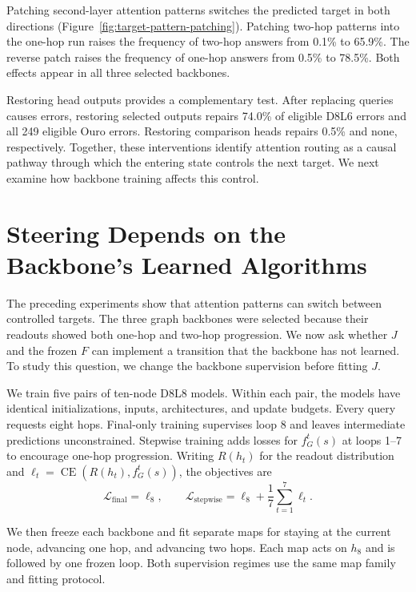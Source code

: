 \documentclass{article}
\begin{document}
Patching second-layer attention patterns switches the predicted target in both directions (Figure~\ref{fig:target-pattern-patching}). Patching two-hop patterns into the one-hop run raises the frequency of two-hop answers from 0.1\% to 65.9\%. The reverse patch raises the frequency of one-hop answers from 0.5\% to 78.5\%. Both effects appear in all three selected backbones.

Restoring head outputs provides a complementary test. After replacing queries causes errors, restoring selected outputs repairs 74.0\% of eligible D8L6 errors and all 249 eligible Ouro errors. Restoring comparison heads repairs 0.5\% and none, respectively. Together, these interventions identify attention routing as a causal pathway through which the entering state controls the next target. We next examine how backbone training affects this control.

\section{Steering Depends on the Backbone's Learned Algorithms}
\label{sec:generalization}\label{sec:supervision-boundary}
The preceding experiments show that attention patterns can switch between controlled targets. The three graph backbones were selected because their readouts showed both one-hop and two-hop progression. We now ask whether $J$ and the frozen $F$ can implement a transition that the backbone has not learned. To study this question, we change the backbone supervision before fitting $J$.

We train five pairs of ten-node D8L8 models. Within each pair, the models have identical initializations, inputs, architectures, and update budgets. Every query requests eight hops. Final-only training supervises loop 8 and leaves intermediate predictions unconstrained. Stepwise training adds losses for $f_G^t(s)$ at loops 1--7 to encourage one-hop progression. Writing $R(h_t)$ for the readout distribution and $\ell_t=\operatorname{CE}(R(h_t),f_G^t(s))$, the objectives are
\begin{equation}
\mathcal{L}_{\mathrm{final}}=\ell_8,\qquad
\mathcal{L}_{\mathrm{stepwise}}=\ell_8+\frac{1}{7}\sum_{t=1}^{7}\ell_t.
\end{equation}



We then freeze each backbone and fit separate maps for staying at the current node, advancing one hop, and advancing two hops. Each map acts on $h_8$ and is followed by one frozen loop. Both supervision regimes use the same map family and fitting protocol.
\end{document}
